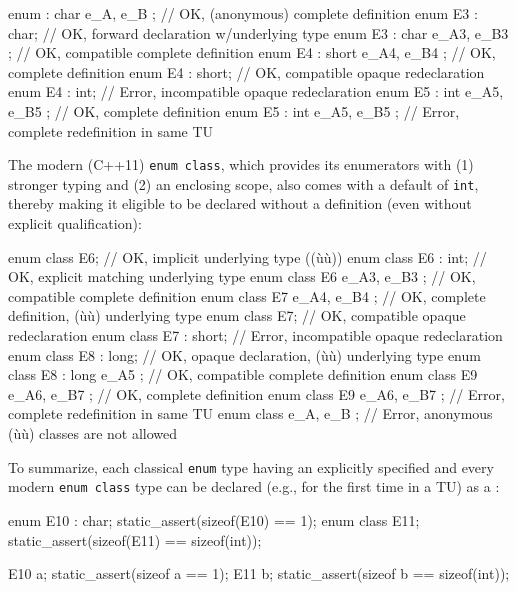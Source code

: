 \begin{emcppslisting}[emcppsbatch=e1]
enum    : char { e_A, e_B };     // OK, (anonymous) complete definition
enum E3 : char;                  // OK, forward declaration w/underlying type
enum E3 : char { e_A3, e_B3 };   // OK, compatible complete definition
enum E4 : short { e_A4, e_B4 };  // OK, complete definition
enum E4 : short;                 // OK, compatible opaque redeclaration
enum E4 : int;                   // Error, incompatible opaque redeclaration
enum E5 : int { e_A5, e_B5 };    // OK, complete definition
enum E5 : int { e_A5, e_B5 };    // Error, complete redefinition in same TU
\end{emcppslisting}

\noindent The modern (C++11) \lstinline!enum!~\lstinline!class!, %
which
provides its enumerators with (1) stronger typing and (2) an enclosing
scope, also comes with a default  of
\lstinline!int!, thereby making it eligible to be declared without a
definition (even without explicit qualification):

\begin{emcppslisting}[emcppsbatch=e1]
enum class E6;                 // OK, implicit underlying type ((ù{}ù))
enum class E6 : int;           // OK, explicit matching underlying type
enum class E6 { e_A3, e_B3 };  // OK, compatible complete definition
enum class E7 { e_A4, e_B4 };  // OK, complete definition, (ù{}ù) underlying type
enum class E7;                 // OK, compatible opaque redeclaration
enum class E7 : short;         // Error, incompatible opaque redeclaration
enum class E8 : long;          // OK, opaque declaration, (ù{}ù) underlying type
enum class E8 : long { e_A5 }; // OK, compatible complete definition
enum class E9 { e_A6, e_B7 };  // OK, complete definition
enum class E9 { e_A6, e_B7 };  // Error, complete redefinition in same TU
enum class    { e_A, e_B };    // Error, anonymous (ù{}ù) classes are not allowed
\end{emcppslisting}

\noindent To summarize, each classical \lstinline!enum! type having an explicitly
specified  and every modern \lstinline!enum!~\lstinline!class! type can be declared (e.g., for the first
time in a TU) as a :

\begin{emcppslisting}[emcppsbatch=e1]
enum E10 : char;  static_assert(sizeof(E10)  == 1);
enum class E11;   static_assert(sizeof(E11) == sizeof(int));

E10 a;            static_assert(sizeof a == 1);
E11 b;            static_assert(sizeof b == sizeof(int));
\end{emcppslisting}

